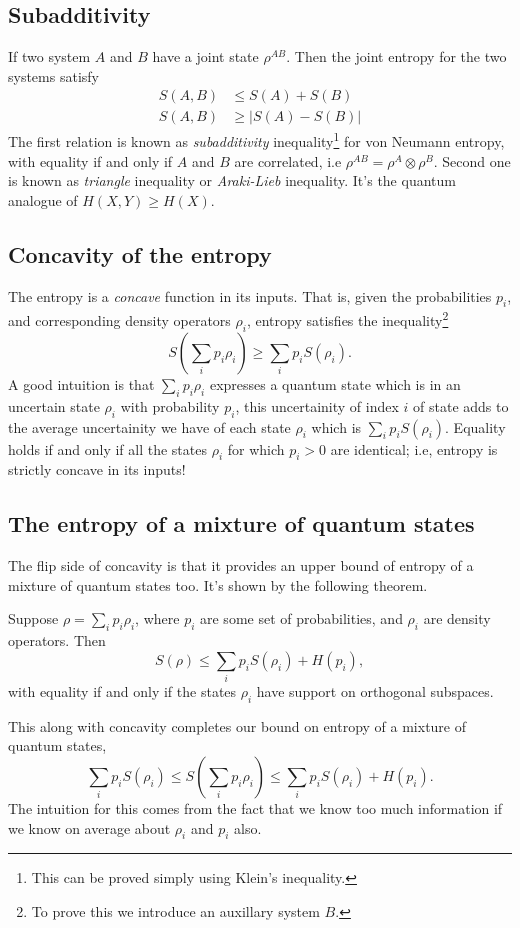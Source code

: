 \subsection{Subadditivity}
If two system $A$ and $B$ have a joint state $\rho^{AB}$. Then the joint entropy for the two systems satisfy
\begin{align}
    S(A,B) &\leq S(A) + S(B) \\
    S(A,B) &\geq |S(A) - S(B)|
\end{align}
The first relation is known as \textit{subadditivity} inequality\footnote{This can be proved simply using Klein's inequality.} for von Neumann entropy, with equality if and only if $A$ and $B$ are correlated, i.e $\rho^{AB}=\rho^A\otimes \rho^B$. Second one is known as \textit{triangle} inequality or \textit{Araki-Lieb} inequality. It's the quantum analogue of $H(X,Y)\geq H(X)$.

\subsection{Concavity of the entropy}
The entropy is a \textit{concave} function in its inputs. That is, given the probabilities $p_i$, and corresponding density operators $\rho_i$, entropy satisfies the inequality\footnote{To prove this we introduce an auxillary system $B$.}
\begin{equation}
    S\left( \sum_i p_i\rho_i \right) \geq \sum_i p_i S(\rho_i).
\end{equation}
A good intuition is that $\sum_ip_i\rho_i$ expresses a quantum state which is in an uncertain state $\rho_i$ with probability $p_i$, this uncertainity of index $i$ of state adds to the average uncertainity we have of each state $\rho_i$ which is $\sum_i p_iS(\rho_i)$. Equality holds if and only if all the states $\rho_i$ for which $p_i>0$ are identical; i.e, entropy is strictly concave in its inputs!

\subsection{The entropy of a mixture of quantum states}
The flip side of concavity is that it provides an upper bound of entropy of a mixture of quantum states too. It's shown by the following theorem.
\begin{theorem}
    Suppose $\rho=\sum_ip_i\rho_i$, where $p_i$ are some set of probabilities, and $\rho_i$ are density operators. Then
    \begin{equation}
        S(\rho) \leq \sum_i p_iS(\rho_i) + H(p_i),
    \end{equation}
    with equality if and only if the states $\rho_i$ have support on orthogonal subspaces.
\end{theorem}
This along with concavity completes our bound on entropy of a mixture of quantum states,
\begin{equation}
    \sum_i p_iS(\rho_i) \leq S\left( \sum_ip_i\rho_i \right) \leq \sum_i p_iS(\rho_i) + H(p_i).
\end{equation}
The intuition for this comes from the fact that we know too much information if we know on average about $\rho_i$ and $p_i$ also.

